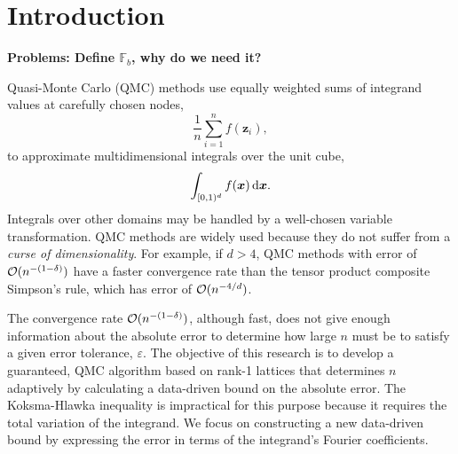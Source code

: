 \documentclass[graybox]{svmult}
\newcommand{\F}{\mathbb{F}} %
\newcommand{\bsx}{\boldsymbol{x}}    %
\newcommand{\bsz}{\boldsymbol{z}}    %
\begin{document}

\section{Introduction}

{\bf Problems:  Define $\F_b$, why do we need it?}

Quasi-Monte Carlo (QMC) methods use equally weighted sums of integrand values at carefully chosen nodes,
\[
\frac 1n \sum_{i=1}^n f(\bsz_i), 
\]
to approximate multidimensional integrals over the unit cube,
\[
\int_{\cube} f(\bsx) \, \dif \bsx.
\]
Integrals over other domains may be handled by a well-chosen variable transformation. QMC methods are widely used because they do not suffer from a \textit{curse of dimensionality}. For example, if $d>4$, QMC methods with error of $\mathcal{O}(n^{-(1-\delta)})$ have a faster convergence rate than the tensor product composite Simpson's rule, which has error of $\mathcal{O}(n^{-4/d})$.

The convergence rate $\mathcal{O}(n^{-(1-\delta)})$, although fast, does not give enough information about the absolute error to determine how large $n$ must be to satisfy a given error tolerance, $\varepsilon$. The objective of this research is to develop a guaranteed, QMC algorithm based on rank-1 lattices that determines $n$ adaptively by calculating a data-driven bound on the absolute error. The Koksma-Hlawka inequality is impractical for this purpose because it requires the total variation of the integrand. We focus on constructing a new data-driven bound by expressing the error in terms of the integrand's Fourier coefficients. 
\end{document}
